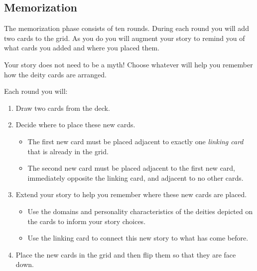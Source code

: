 \subsection*{Memorization}

The memorization phase consists of ten rounds.
During each round you will add two cards to the grid.
As you do you will augment your story to remind you of what cards you added and where you placed them.

Your story does not need to be a myth!
Choose whatever will help you remember how the deity cards are arranged.


\newpage

Each round you will:
\begin{enumerate}[leftmargin=*]
\item Draw two cards from the deck.
\item Decide where to place these new cards.
\begin{itemize}[leftmargin=*]
	\item The first new card must be placed adjacent to exactly one \emph{linking card} that is already in the grid.
	\item The second new card must be placed adjacent to the first new card, immediately opposite the linking card, and adjacent to no other cards.
\end{itemize}
\item Extend your story to help you remember where these new cards are placed.
\begin{itemize}[leftmargin=*]
\item Use the domains and personality characteristics of the deities depicted on the cards to inform your story choices.
\item Use the linking card to connect this new story to what has come before.
\end{itemize}
\item Place the new cards in the grid and then flip them so that they are face down.
\end{enumerate}